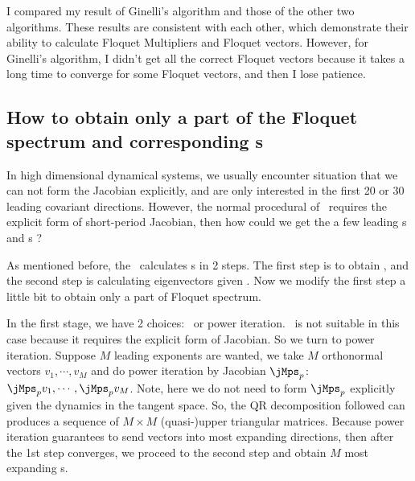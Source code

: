 I compared my result of Ginelli's algorithm and those of the other two
algorithms. These results are consistent with each other, which
demonstrate their ability to calculate Floquet Multipliers and Floquet
vectors. However, for Ginelli's algorithm, I didn't get all
the correct Floquet vectors because it takes a long time to converge for
some Floquet vectors, and then I lose patience.

\subsection{How to obtain only a part of the Floquet spectrum
  and corresponding \Fv s}
In high dimensional dynamical systems, we usually encounter
situation that we can not form the Jacobian explicitly, and
are only interested in the first 20 or 30 leading covariant
directions. However, the normal procedural of \ped\ requires the
explicit form of short-period Jacobian, then how could we
get the a few leading \Fe s and \Fv s ?

As mentioned before, the \ped\ calculates \Fv s in 2 steps. The first
step is to obtain \prsf, and the second step is calculating
eigenvectors given \prsf. Now we modify the first step a little bit
to obtain only a part of Floquet spectrum.

In the first stage,
we have 2 choices: \psd\ or power iteration. \psd\ is not suitable
in this case because it requires the explicit form of Jacobian.
So we turn to power iteration. Suppose $M$ leading exponents are wanted,
we take $M$ orthonormal vectors $v_1, \cdots, v_M$ and
do power iteration by Jacobian $\jMps_p$:
$\jMps_p v_1, \cdots, \jMps_p v_M$.
Note, here we do not need to form $\jMps_p$ explicitly
given the dynamics in the tangent space. So, the QR decomposition
followed
can produces a sequence of $M\times M$ (quasi-)upper triangular
matrices. Because power iteration guarantees to send vectors into
most expanding directions, then after the 1st step converges,
we proceed to the second step and obtain $M$ most
expanding \Fv s.

